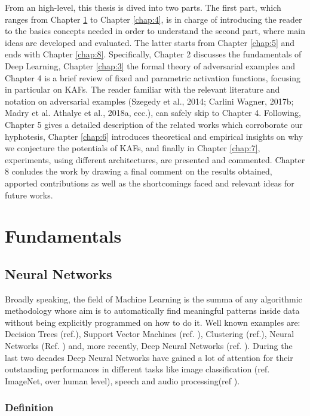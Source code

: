 \documentclass[LaM,binding=0.6cm]{./packages/sapthesis/sapthesis}
\begin{document}
    From an high-level, this thesis is dived into two parts. The first part, which ranges from Chapter \ref{chap:2} to Chapter \ref{chap:4}, is in charge of introducing the reader 
    to the basics concepts needed in order to understand the second part, where main ideas are developed and evaluated. The latter starts from Chapter \ref{chap:5} and ends with Chapter \ref{chap:8}.
    Specifically, Chapter 2 discusses the fundamentals of Deep Learning, Chapter \ref{chap:3} the formal theory of adversarial examples and Chapter 4 is a brief review of
    fixed and parametric activation functions, focusing in particular on KAFs. The reader familiar with the relevant literature and notation on adversarial 
    examples (Szegedy et al., 2014; Carlini  Wagner, 2017b; Madry et al. Athalye et al., 2018a, ecc.), can safely skip to Chapter 4.
    Following, Chapter 5 gives a detailed description of the related works which corroborate our hyphotesis, Chapter \ref{chap:6} introduces theoretical 
    and empirical insights on why we conjecture the potentials of KAFs, and finally in Chapter \ref{chap:7}, experiments, using different architectures, 
    are presented and commented. Chapter 8 conludes the work by drawing a final comment on the results obtained, apported contributions 
    as well as the shortcomings faced and relevant ideas for future works.

\part{Fundamentals}


\chapter{Neural Networks}
        \label{chap:2}
        Broadly speaking, the field of Machine Learning is the summa of any algorithmic methodology whose aim is to automatically find meaningful patterns inside data without
        being explicitly programmed on how to do it. Well known examples are: Decision Trees (ref.), Support Vector Machines (ref. ), Clustering (ref.),
        Neural Networks (Ref. ) and, more recently, 
        Deep Neural Networks (ref. ). During the last two decades Deep Neural Networks have gained a lot of attention for their outstanding performances in different tasks like
        image classification (ref. ImageNet, over human level), speech and audio processing(ref ).

        \section{Definition}
            
\end{document}
